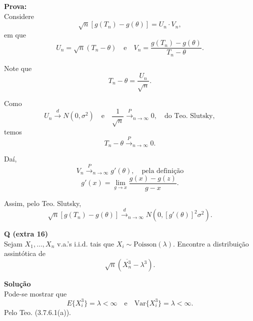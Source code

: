 \textbf{Prova:} \\
Considere
\begin{equation}
\sqrt{n} \left[ g(T_n) - g(\theta) \right] = U_n \cdot V_n,
\end{equation}
em que
\begin{equation}
U_n = \sqrt{n} (T_n - \theta) \quad \text{e} \quad V_n = \frac{g(T_n) - g(\theta)}{T_n - \theta}.
\end{equation}

Note que 
\begin{equation}
T_n - \theta = \frac{U_n}{\sqrt{n}}.
\end{equation}

Como
\begin{equation}
U_n \xrightarrow{d} N(0, \sigma^2) \quad \text{e} \quad \frac{1}{\sqrt{n}} \xrightarrow{P}_{n \to \infty} 0, \quad \text{do Teo. Slutsky},
\end{equation}
temos
\begin{equation}
T_n - \theta \xrightarrow{P}_{n \to \infty} 0.
\end{equation}

Daí, 
\begin{equation}
V_n \xrightarrow{P}_{n \to \infty} g'(\theta), \quad \text{pela definição}
\end{equation}
\begin{equation}
g'(x) = \lim_{g \to x} \frac{g(x) - g(z)}{g - x}.
\end{equation}

Assim, pelo Teo. Slutsky,
\begin{equation}
\sqrt{n} \left[ g(T_n) - g(\theta) \right] \xrightarrow{d}_{n \to \infty} N\left(0, \left[ g'(\theta) \right]^2 \sigma^2 \right).
\end{equation}

\textbf{Q (extra 16)} \\
Sejam $X_1, \ldots, X_n$ v.a.'s i.i.d. tais que $X_i \sim \text{Poisson}(\lambda)$. Encontre a distribuição assintótica de 
\begin{equation}
\sqrt{n} \left( \overline{X_n^3} - \lambda^3 \right).
\end{equation}

\textbf{Solução} \\
Pode-se mostrar que
\begin{equation}
E\{ X_i^3 \} = \lambda < \infty \quad \text{e} \quad \text{Var}\{ X_i^3 \} = \lambda < \infty.
\end{equation}
Pelo Teo. (3.7.6.1(a)).